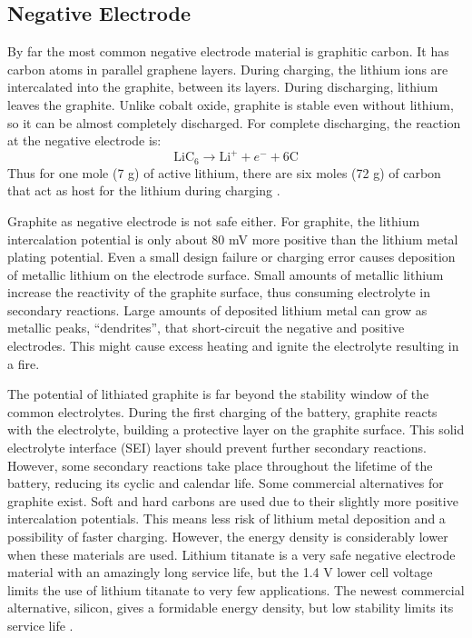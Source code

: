 \subsection{Negative Electrode}
\label{sec:negative-electrode}
By far the most common negative electrode material is graphitic carbon. It has carbon atoms in parallel graphene layers. During charging, the lithium ions are intercalated into the graphite, between its layers. During discharging, lithium leaves the graphite. Unlike cobalt oxide, graphite is stable even without lithium, so it can be almost completely discharged. For complete discharging, the reaction at the negative electrode is:
\begin{equation}
    \label{eq:negative-electrode}
    \text{LiC}_6 \rightarrow \text{Li}^+ + e^- + 6\text{C}
\end{equation}
Thus for one mole (7 g) of active lithium, there are six moles (72 g) of carbon that act as host for the lithium during charging \cite{korthauer2018lithium}.

Graphite as negative electrode is not safe either. For graphite, the lithium intercalation potential is only about 80 mV more positive than the lithium metal plating potential. Even a small design failure or charging error causes deposition of metallic lithium on the electrode surface. Small amounts of metallic lithium increase the reactivity of the graphite surface, thus consuming electrolyte in secondary reactions. Large amounts of deposited lithium metal can grow as metallic peaks, “dendrites”, that short-circuit the negative and positive electrodes. This might cause excess heating and ignite the electrolyte resulting in a fire.

The potential of lithiated graphite is far beyond the stability window of the common electrolytes. During the first charging of the battery, graphite reacts with the electrolyte, building a protective layer on the graphite surface. This solid electrolyte interface (SEI) layer should prevent further secondary reactions. However, some secondary reactions take place throughout the lifetime of the battery, reducing its cyclic and calendar life.
Some commercial alternatives for graphite exist. Soft and hard carbons are used due to their slightly more positive intercalation potentials. This means less risk of lithium metal deposition and a possibility of faster charging.
However, the energy density is considerably lower when these materials are used. Lithium titanate is a very safe negative electrode material with an amazingly long service life, but the 1.4 V lower cell voltage limits the use of lithium titanate to very few applications. The newest commercial alternative, silicon, gives a formidable energy density, but low stability limits its service life \cite{mekonnen2016review,nzereogu2022anode}.


